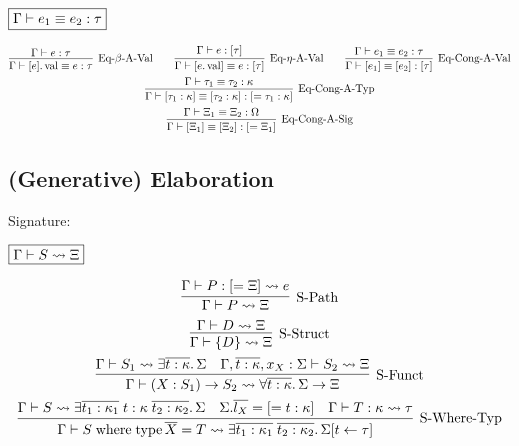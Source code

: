 $\fbox{$\Gamma \vdash e_1 \equiv e_2: \tau$}$

\begin{gather*}
  \infer[\text{Eq-$\beta$-A-Val}]{\Gamma \vdash [e].\symval \equiv e: \tau}{
    \Gamma \vdash e: \tau
  }
  \hspace{2em}
  \infer[\text{Eq-$\eta$-A-Val}]{\Gamma \vdash [e.\symval] \equiv e: [\tau]}{
    \Gamma \vdash e: [\tau]
  }
  \hspace{2em}
  \infer[\text{Eq-Cong-A-Val}]{\Gamma \vdash [e_1] \equiv [e_2]: [\tau]}{
    \Gamma \vdash e_1 \equiv e_2: \tau
  }
  \\
  \infer[\text{Eq-Cong-A-Typ}]{\Gamma \vdash [\tau_1: \kappa] \equiv [\tau_2: \kappa]: [= \tau_1: \kappa]}{
    \Gamma \vdash \tau_1 \equiv \tau_2: \kappa
  }
  \\
  \infer[\text{Eq-Cong-A-Sig}]{\Gamma \vdash [\Xi_1] \equiv [\Xi_2]: [= \Xi_1]}{
    \Gamma \vdash \Xi_1 \equiv \Xi_2: \Omega
  }
\end{gather*}

\subsection{(Generative) Elaboration}

Signature:

$\fbox{$\Gamma \vdash S \rightsquigarrow \Xi$}$

\begin{gather*}
  \infer[\text{S-Path}]{\Gamma \vdash P \elaborate \Xi}{
    \Gamma \vdash P: [= \Xi] \elaborate e
  }
  \\
  \infer[\text{S-Struct}]{\Gamma \vdash \{D\} \elaborate \Xi}{
    \Gamma \vdash D \elaborate \Xi
  }
  \\
  \infer[\text{S-Funct}]{\Gamma \vdash (X: S_1) \to S_2 \elaborate \forall \overline{t: \kappa}\ldotp \Sigma \to \Xi}{
    \Gamma \vdash S_1 \elaborate \exists \overline{t: \kappa}\ldotp \Sigma
    &
    \Gamma, \overline{t: \kappa}, x_X: \Sigma \vdash S_2 \elaborate \Xi
  }
  \\
  \infer[\text{S-Where-Typ}]{\Gamma \vdash S \symwhere \symtype \overline{X} = T \elaborate \exists \overline{t_1: \kappa_1}\; \overline{t_2: \kappa_2}\ldotp \Sigma[t \assign \tau]}{
    \Gamma \vdash S \elaborate \exists \overline{t_1: \kappa_1}\; t: \kappa\; \overline{t_2: \kappa_2} \ldotp \Sigma
    &
    \Sigma.\overline{l_X} = [= t: \kappa]
    &
    \Gamma \vdash T: \kappa \elaborate \tau
  }
\end{gather*}

